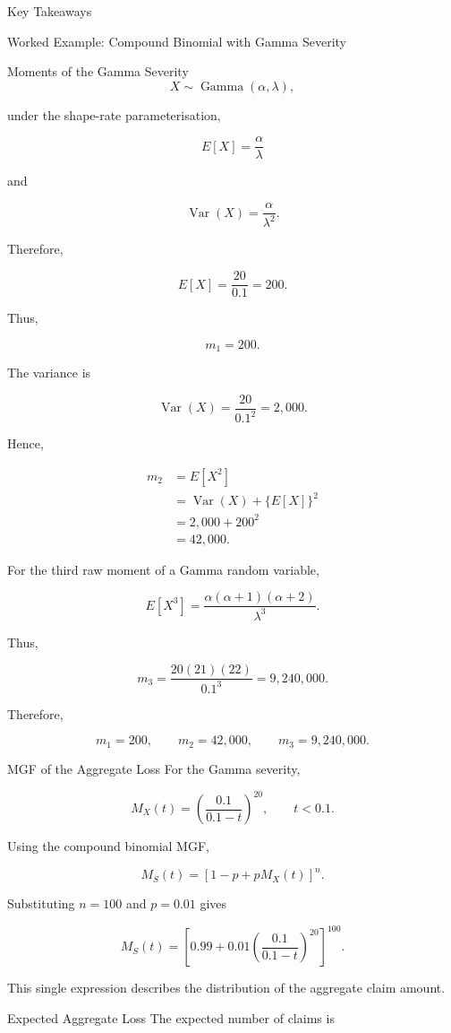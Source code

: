 \documentclass[
  ignorenonframetext,
  aspectratio=169,
]{beamer}
\begin{document}
\begin{frame}{Key Takeaways}
\begin{block}{Worked Example: Compound Binomial with Gamma Severity}
\begin{block}{Moments of the Gamma Severity}
\[
X\sim\operatorname{Gamma}(\alpha,\lambda),
\]

under the shape-rate parameterisation,

\[
E[X]=\frac{\alpha}{\lambda}
\]

and

\[
\operatorname{Var}(X)=\frac{\alpha}{\lambda^2}.
\]

Therefore,

\[
E[X]
=
\frac{20}{0.1}
=
200.
\]

Thus,

\[
m_1=200.
\]

The variance is

\[
\operatorname{Var}(X)
=
\frac{20}{0.1^2}
=
2{,}000.
\]

Hence,

\[
\begin{aligned}
m_2
&=E[X^2]\\
&=\operatorname{Var}(X)+\{E[X]\}^2\\
&=2{,}000+200^2\\
&=42{,}000.
\end{aligned}
\]

For the third raw moment of a Gamma random variable,

\[
E[X^3]
=
\frac{\alpha(\alpha+1)(\alpha+2)}
{\lambda^3}.
\]

Thus,

\[
m_3
=
\frac{20(21)(22)}{0.1^3}
=
9{,}240{,}000.
\]

Therefore,

\[
\boxed{
m_1=200,\qquad
m_2=42{,}000,\qquad
m_3=9{,}240{,}000.
}
\]
\end{block}

\begin{block}{MGF of the Aggregate Loss}
\protect{}\label{mgf-of-the-aggregate-loss-1}
For the Gamma severity,

\[
M_X(t)
=
\left(
\frac{0.1}{0.1-t}
\right)^{20},
\qquad t<0.1.
\]

Using the compound binomial MGF,

\[
M_S(t)
=
[1-p+pM_X(t)]^n.
\]

Substituting \(n=100\) and \(p=0.01\) gives

\[
\boxed{
M_S(t)
=
\left[
0.99+
0.01
\left(
\frac{0.1}{0.1-t}
\right)^{20}
\right]^{100}.
}
\]

This single expression describes the distribution of the aggregate claim
amount.
\end{block}

\begin{block}{Expected Aggregate Loss}
\protect{}\label{expected-aggregate-loss-3}
The expected number of claims is


\end{block}
\end{block}
\end{frame}
\end{document}
